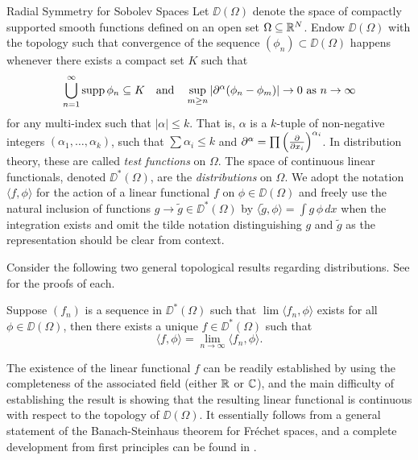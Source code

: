 \begin{chapter}{Radial Symmetry for Sobolev Spaces}
Let $\DD(\Omega)$ denote the space of compactly supported smooth functions defined on an open set $\Omega \subseteq \mathbb R^N$.
Endow $\DD(\Omega)$ with the topology such that convergence of the sequence $(\phi_n)\subset \DD(\Omega)$ happens whenever there exists a compact set $K$ such that 
\begin{equation}
  \bigcup_{n=1}^\infty \operatorname*{supp} \phi_n \subseteq K \quad\text{and}\quad
  \sup_{m\ge n} \left|\partial^\alpha (\phi_n-\phi_m)\right|\to 0\text{ as }n\to\infty \label{eq:testFunctionContinuity}
\end{equation} 
for any multi-index such that $|\alpha|\le k$.
That is,  $\alpha$ is a $k$-tuple of non-negative integers $(\alpha_1,\dots, \alpha_k)$, such that $\sum \alpha_i \le k$ and $\partial^\alpha = \prod \left(\frac{\partial}{\partial x_i}\right)^{\alpha_i}$.
In distribution theory, these are called \emph{test functions} on $\Omega$.
The space of continuous linear functionals, denoted $\DD^*(\Omega)$, are the \emph{distributions} on $\Omega$.
We adopt the notation $\langle f, \phi\rangle$ for the action of a linear functional $f$ on $\phi \in \DD(\Omega)$ and freely use the natural inclusion of functions $g \to \tilde g \in \DD^*(\Omega)$ by $\langle \tilde g, \phi \rangle = \int g\, \phi\,dx$ when the integration exists and omit the tilde notation distinguishing $g$ and $\tilde g$ as the representation should be clear from context. 

Consider the following two general topological results regarding distributions. 
See \citep[Chapter 2]{hormander1983} for the proofs of each.
\begin{thm} \label{thm:completeness}
  \citep{hormander1983} Suppose $(f_n)$ is a sequence in $\DD^*(\Omega)$ such that $\lim\langle f_n,\phi\rangle$ exists for all $\phi \in \DD(\Omega)$, then there exists a unique $f\in \DD^*(\Omega)$ such that
  \begin{equation}
    \langle f, \phi\rangle = \lim_{n\to\infty} \langle f_n, \phi \rangle.
  \end{equation}
\end{thm}
The existence of the linear functional $f$ can be readily established by using the completeness of the associated field (either $\mathbb R$ or $\mathbb C$), and the main difficulty of establishing the result is showing that the resulting linear functional is continuous with respect to the topology of $\DD(\Omega)$.
It essentially follows from a general statement of the Banach-Steinhaus theorem for Fr\'{e}chet spaces, and a complete development from first principles can be found in \citep{rudin1991}.


\end{chapter}
